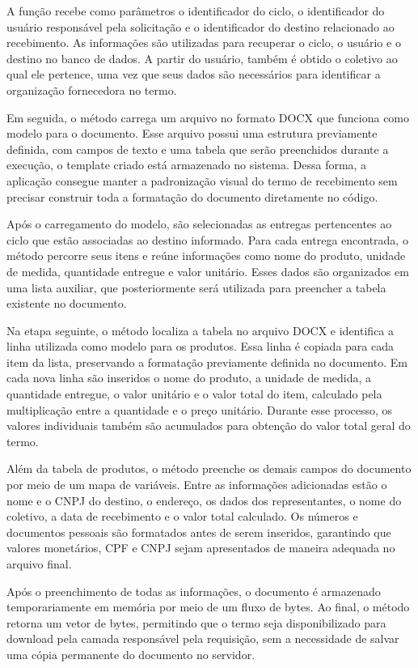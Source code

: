 A função recebe como parâmetros o identificador do ciclo, o identificador do usuário responsável pela solicitação e o identificador do destino relacionado ao recebimento. As informações são utilizadas para recuperar o ciclo, o usuário e o destino no banco de dados. A partir do usuário, também é obtido o coletivo ao qual ele pertence, uma vez que seus dados são necessários para identificar a organização fornecedora no termo.

Em seguida, o método carrega um arquivo no formato DOCX que funciona como modelo para o documento. Esse arquivo possui uma estrutura previamente definida, com campos de texto e uma tabela que serão preenchidos durante a execução, o template criado está armazenado no sistema. Dessa forma, a aplicação consegue manter a padronização visual do termo de recebimento sem precisar construir toda a formatação do documento diretamente no código.

Após o carregamento do modelo, são selecionadas as entregas pertencentes ao ciclo que estão associadas ao destino informado. Para cada entrega encontrada, o método percorre seus itens e reúne informações como nome do produto, unidade de medida, quantidade entregue e valor unitário. Esses dados são organizados em uma lista auxiliar, que posteriormente será utilizada para preencher a tabela existente no documento.

Na etapa seguinte, o método localiza a tabela no arquivo DOCX e identifica a linha utilizada como modelo para os produtos. Essa linha é copiada para cada item da lista, preservando a formatação previamente definida no documento. Em cada nova linha são inseridos o nome do produto, a unidade de medida, a quantidade entregue, o valor unitário e o valor total do item, calculado pela multiplicação entre a quantidade e o preço unitário. Durante esse processo, os valores individuais também são acumulados para obtenção do valor total geral do termo.

Além da tabela de produtos, o método preenche os demais campos do documento por meio de um mapa de variáveis. Entre as informações adicionadas estão o nome e o CNPJ do destino, o endereço, os dados dos representantes, o nome do coletivo, a data de recebimento e o valor total calculado. Os números e documentos pessoais são formatados antes de serem inseridos, garantindo que valores monetários, CPF e CNPJ sejam apresentados de maneira adequada no arquivo final.

Após o preenchimento de todas as informações, o documento é armazenado temporariamente em memória por meio de um fluxo de bytes. Ao final, o método retorna um vetor de bytes, permitindo que o termo seja disponibilizado para download pela camada responsável pela requisição, sem a necessidade de salvar uma cópia permanente do documento no servidor.

